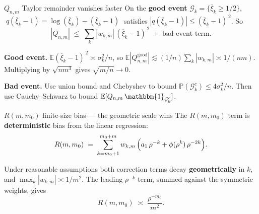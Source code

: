 \documentclass[10pt, aspectratio=169, xcolor={table}]{beamer}
\newcommand{\E}{\mathbb{E}}
\renewcommand{\P}{\mathbb{P}}
\begin{document}
\begin{frame}{$Q_{n,m}$ Taylor remainder vanishes faster}
  On the \textbf{good event}
  $\mathcal{G}_k = \{\overline{\xi}_k \ge 1/2\}$,
  $\;q(\overline{\xi}_k - 1) = \log(\overline{\xi}_k) - (\overline{\xi}_k - 1)\;$
  satisfies $|q(\overline{\xi}_k-1)| \le (\overline{\xi}_k - 1)^{\,2}$. So
  \[
    |Q_{n,m}| \;\le\; \sum_k |w_{k,m}|\, (\overline{\xi}_k - 1)^{\,2}
                 \;+\; \text{bad-event term}.
  \]

  \vspace{0.4em}
  \textbf{Good event.} $\E(\overline{\xi}_k - 1)^{\,2} \asymp
  \sigma_k^2/n$, so $\E|Q_{n,m}^{\text{good}}| \lesssim
  (1/n)\sum_k |w_{k,m}| \asymp 1/(nm)$. Multiplying by $\sqrt{nm^3}$
  gives $\sqrt{m/n} \to 0$.

  \vspace{0.4em}
  \textbf{Bad event.} Use union bound and Chebyshev to
  bound $\P(\mathcal{G}_k^c) \le 4\sigma_k^2/n$. Then use
  Cauchy--Schwarz to bound $\E[Q_{n,m}\,\mathbbm{1}_{\mathcal{G}_k^c}]$.
\end{frame}

\begin{frame}{$R(m,m_0)$ finite-size bias --- the geometric scale wins}
  The $R(m,m_0)$ term is \textbf{deterministic} bias from the linear
  regression:
  \[
    R(m,m_0) \;=\; \sum_{k = m_0+1}^{m_0+m} w_{k,m}\,
        \Bigl(a_1\,\rho^{-k} + \phi(\rho^k)\,\rho^{-2k}\Bigr).
  \]

  \vspace{0.4em}
  Under reasonable assumptions both correction terms decay
  \textbf{geometrically} in $k$, and $\max_k |w_{k,m}| \asymp 1/m^2$.
  The leading $\rho^{-k}$ term, summed against the symmetric weights,
  gives
  \[
    R(m,m_0) \;\asymp\; \frac{\rho^{-m_0}}{m^2}.
  \]

\end{frame}

\end{document}
